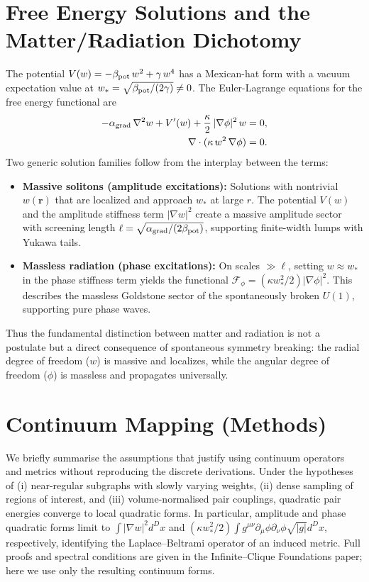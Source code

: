 \documentclass[11pt]{article}
\begin{document}
\section{Free Energy Solutions and the Matter/Radiation Dichotomy}\label{app:free_energy_solutions}
The potential $V(w) = -\beta_{\rm pot}\,w^2 + \gamma\,w^4$ has a Mexican-hat form with a vacuum expectation value at $w_* = \sqrt{\beta_{\rm pot}/(2\gamma)}\neq 0$. The Euler-Lagrange equations for the free energy functional are
\begin{align}
  -\alpha_{\rm grad}\,\nabla^2 w + V'(w) + \frac{\kappa}{2}\,|\nabla\phi|^2\,w &= 0,\\
  \nabla\cdot (\kappa\,w^2\,\nabla\phi) &= 0.
\end{align}
Two generic solution families follow from the interplay between the terms:
\begin{itemize}[leftmargin=*]
  \item \textbf{Massive solitons (amplitude excitations):} Solutions with nontrivial $w(\mathbf r)$ that are localized and approach $w_*$ at large $r$. The potential $V(w)$ and the amplitude stiffness term $|\nabla w|^2$ create a massive amplitude sector with screening length $\ell=\sqrt{\alpha_{\rm grad}/(2\beta_{\rm pot})}$, supporting finite-width lumps with Yukawa tails.
  \item \textbf{Massless radiation (phase excitations):} On scales $\gg \ell$, setting $w\approx w_*$ in the phase stiffness term yields the functional $\mathcal F_\phi= (\kappa w_*^2/2)|\nabla\phi|^2$. This describes the massless Goldstone sector of the spontaneously broken $U(1)$, supporting pure phase waves.
\end{itemize}
Thus the fundamental distinction between matter and radiation is not a postulate but a direct consequence of spontaneous symmetry breaking: the radial degree of freedom ($w$) is massive and localizes, while the angular degree of freedom ($\phi$) is massless and propagates universally.

\section{Continuum Mapping (Methods)}\label{app:disccont}
We briefly summarise the assumptions that justify using continuum operators and metrics without reproducing the discrete derivations. Under the hypotheses of (i) near-regular subgraphs with slowly varying weights, (ii) dense sampling of regions of interest, and (iii) volume-normalised pair couplings, quadratic pair energies converge to local quadratic forms. In particular, amplitude and phase quadratic forms limit to $\int |\nabla w|^2 d^Dx$ and $(\kappa w_*^2/2)\int g^{\mu\nu}\partial_\mu\phi\partial_\nu\phi\sqrt{|g|}d^Dx$, respectively, identifying the Laplace--Beltrami operator of an induced metric. Full proofs and spectral conditions are given in the Infinite--Clique Foundations paper; here we use only the resulting continuum forms.
\end{document}

